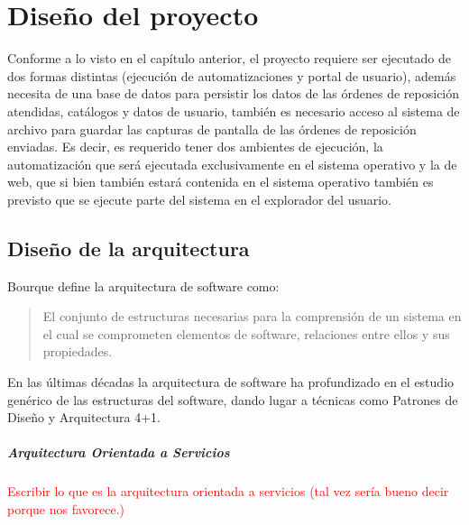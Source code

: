 \chapter{Diseño del proyecto}\label{cap3}
Conforme a lo visto en el capítulo anterior, el proyecto requiere ser ejecutado de dos formas distintas (ejecución de automatizaciones y portal de usuario), además necesita de una base de datos para persistir los datos de las órdenes de reposición atendidas, catálogos y datos de usuario, también es necesario acceso al sistema de archivo para guardar las capturas de pantalla de las órdenes de reposición enviadas. Es decir, es requerido tener dos ambientes de ejecución, la automatización que será ejecutada exclusivamente en el sistema operativo y la de web, que si bien también estará contenida en el sistema operativo también es previsto que se ejecute parte del sistema en el explorador del usuario.




\section{Diseño de la arquitectura}
Bourque define la arquitectura de software como:
\begin{quote}
	El conjunto de estructuras necesarias para la comprensión de un sistema en el cual se comprometen elementos de software, relaciones entre ellos y sus propiedades.\cite{SWEBOOK}
\end{quote}
En las últimas décadas la arquitectura de software ha profundizado en el estudio genérico de las estructuras del software, dando lugar a técnicas como Patrones de Diseño y Arquitectura 4+1.
\paragraph{Arquitectura Orientada a Servicios}
\textcolor{red}{Escribir lo que es la arquitectura orientada a servicios (tal vez sería bueno decir porque nos favorece.)}
